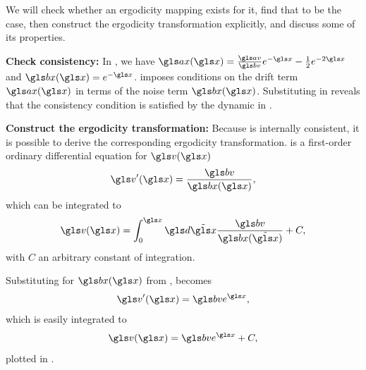 We will check whether an ergodicity 
mapping exists for it, find that to be the case, then construct the 
ergodicity transformation explicitly, and discuss some of its properties.

{\bf Check consistency:}
In , we have $\ax(\x)=\frac{\av}{\bv}e^{-\x}-\frac{1}{2}e^{-2\x}$ and $\bx(\x)=e^{-\x}$.
 imposes conditions on the drift term $\ax(\x)$ in terms of the 
noise term $\bx(\x)$. Substituting in  reveals that the consistency 
condition is satisfied by the dynamic in .

{\bf Construct the ergodicity transformation:}
Because  is internally consistent, it is possible to derive the corresponding ergodicity transformation.
 is a first-order ordinary differential equation for $\gv(\x)$
\begin{align}
\gv'(\x)=\frac{\bv}{\bx(\x)},
\elabel{diff_eq_u}
\end{align}
which can be integrated to
\begin{align}
\gv(\x)=\int_0^\x \gd\tilde{\x} \frac{\bv}{\bx(\tilde{\x})}+C,
\end{align}
with $C$ an arbitrary constant of integration. 

Substituting for $\bx(\x)$ from ,  becomes
\begin{equation}
\gv'(\x)=\bv e^\x,
\end{equation}
which is easily integrated to
\begin{equation}
\gv(\x)=\bv e^\x +C,
\elabel{test_dyn_u}
\end{equation}
plotted in . 


